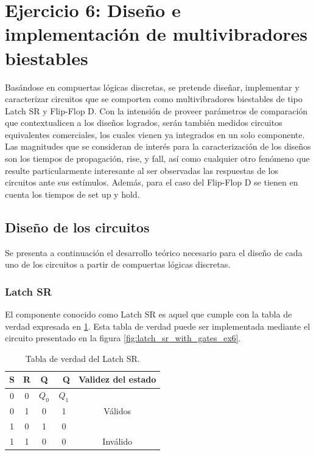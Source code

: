\section{Ejercicio 6: Dise\~no e implementaci\'on de multivibradores biestables}
Basándose en compuertas lógicas discretas, se pretende diseñar, implementar y caracterizar circuitos que se comporten como multivibradores biestables de tipo Latch SR y 
Flip-Flop D.
Con la intensión de proveer parámetros de comparación que contextualicen a los diseños logrados, serán también medidos circuitos equivalentes comerciales, los cuales vienen 
ya integrados en un solo componente. \\
Las magnitudes que se consideran de interés para la caracterización de los diseños son los tiempos de propagación, rise, y fall, así como cualquier otro 
fenómeno que resulte particularmente interesante al ser observadas las respuestas de los circuitos ante sus estímulos.
Además, para el caso del Flip-Flop D se tienen en cuenta los tiempos de set up y hold.



\subsection{Diseño de los circuitos}
Se presenta a continuación el desarrollo teórico necesario para el diseño de cada uno de los circuitos a partir de compuertas lógicas discretas.


\subsubsection{Latch SR}
El componente conocido como Latch SR es aquel que cumple con la tabla de verdad expresada en \ref{table:latch_sr_truth_table_ex6}.
Esta tabla de verdad puede ser implementada mediante el circuito presentado en la figura \ref{fig:latch_sr_with_gates_ex6}.

\begin{table}[H]
    \centering
    \begin{tabular}{cc|cc|c}
    \textbf{S} & \textbf{R} & \textbf{Q} & \textbf{~Q} & \textbf{Validez del estado} \\ \hline
    0          & 0          & $Q_0$      & $Q_1$       & \multirow{3}{*}{Válidos}    \\
    0          & 1          & 0          & 1           &                             \\
    1          & 0          & 1          & 0           &                             \\ \cline{5-5} 
    1          & 1          & 0          & 0           & Inválido                   
    \end{tabular}
    \caption{Tabla de verdad del Latch SR.}
    \label{table:latch_sr_truth_table_ex6}
\end{table}

